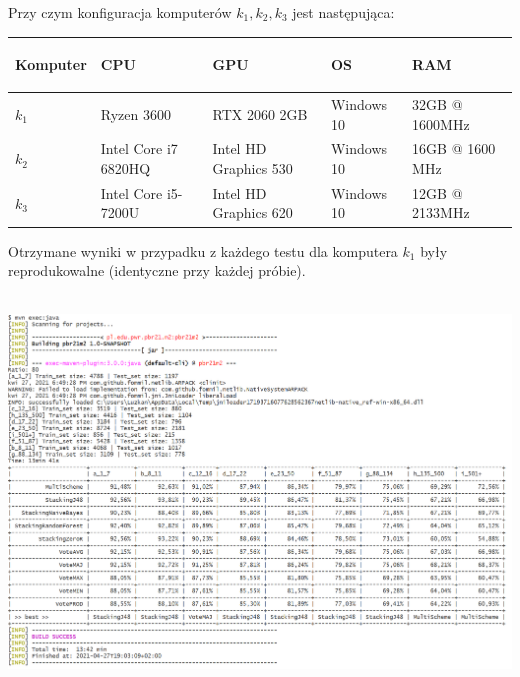 \documentclass[graybox]{svmult}
\begin{document}
Przy czym konfiguracja komputerów $k_{1}, k_{2}, k_{3}$ jest następująca:

\begin{table}[!h]
\centering
        
\begin{tabular}{|p{}|p{}|p{}|p{}|p{}|}
\hline 
 \begin{center}
\textbf{Komputer}
\end{center}
 & \begin{center}
\textbf{CPU}
\end{center}
 & \begin{center}
\textbf{GPU}
\end{center}
 & \begin{center}
\textbf{OS}
\end{center}
 & \begin{center}
\textbf{RAM}
\end{center}
 \\
\hline 
 $\displaystyle k_{1}$ & Ryzen 3600 & RTX 2060 2GB & Windows 10 & 32GB @ 1600MHz \\
\hline 
 $\displaystyle k_{2}$ & Intel Core i7  6820HQ & Intel HD Graphics 530  & Windows 10 & 16GB @ 1600 MHz \\
\hline 
 $\displaystyle k_{3}$ &Intel Core i5-7200U  &Intel HD Graphics 620  & Windows 10 & 12GB @ 2133MHz  \\
 \hline
\end{tabular}
        
\end{table}

Otrzymane wyniki w przypadku z każdego testu dla komputera $k_{1}$ były reprodukowalne (identyczne przy każdej próbie).

\begin{frame}{}
\hbox{\hspace{-5.0em} \includegraphics[scale=0.27]{img/results.png}}
\end{frame}
\end{document}
